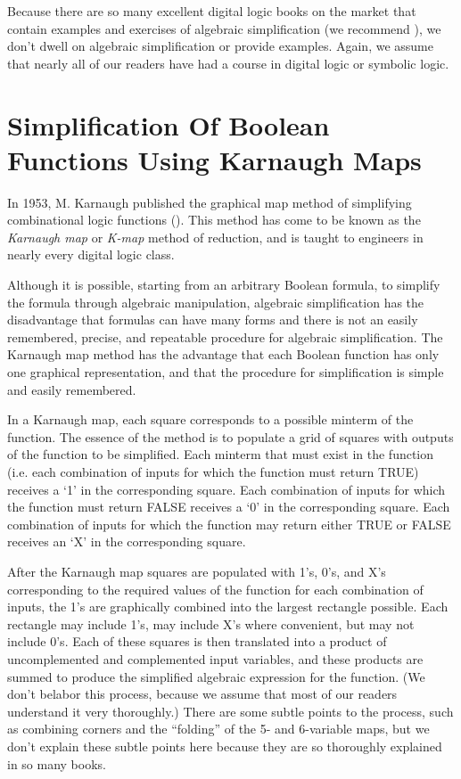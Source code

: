 Because there are so many excellent digital logic books on the market
that contain examples and exercises of algebraic simplification
(we recommend \cite{bibref:b:manodigitaldesignseconded}), we don't
dwell on algebraic simplification or provide examples.  Again, we
assume that nearly all of our readers have had a course in digital
logic or symbolic logic.


\section[Karnaugh Maps]
        {Simplification Of Boolean Functions Using Karnaugh Maps}
\label{cbal0:skm0}

In 1953, M. Karnaugh published the graphical map method of simplifying
combinational logic functions (\cite{bibref:p:kmapclassic01}).  This
method has come to be known as the \emph{Karnaugh map} or \emph{K-map}
method of reduction, and is taught to engineers in nearly every
digital logic class.

Although it is possible, starting from an arbitrary Boolean formula, to simplify
the formula through algebraic manipulation, algebraic simplification
has the disadvantage that formulas can have many forms and there is not
an easily remembered, precise, and repeatable procedure for algebraic simplification.
The Karnaugh map method has the advantage that each Boolean function
has only one graphical representation, and that the procedure for simplification
is simple and easily remembered.

In a Karnaugh map, each square corresponds to a possible minterm of the function.
The essence of the method is to populate a grid of squares with outputs of
the function to be simplified.  Each minterm that must exist in the
function (i.e. each combination of inputs for which the function
must return TRUE) receives a `1' in the corresponding square.  Each
combination of inputs for which the function must return FALSE
receives a `0' in the corresponding square.  Each combination of inputs
for which the function may return either TRUE or FALSE receives an
`X' in the corresponding square.

After the Karnaugh map squares are populated with 1's, 0's, and X's
corresponding to the required values of the function for each combination
of inputs, the 1's are graphically combined into the largest rectangle possible.
Each rectangle may include 1's, may include X's where convenient, but
may not include 0's.
Each of these squares is then translated into a product of uncomplemented and
complemented input variables, and these products are summed to
produce the simplified algebraic expression for the function.  (We don't 
belabor this process, because we assume that most of our readers
understand it very thoroughly.)  There are some subtle points
to the process, such as combining corners and the ``folding'' of the
5- and 6-variable maps, but we don't explain these subtle points here
because they are so thoroughly explained in so many books.


